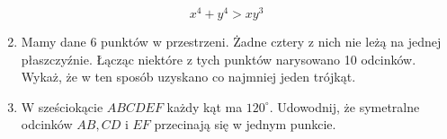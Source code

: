 \documentclass[10pt]{article}
\begin{document}
\[
x^{4}+y^{4}>x y^{3}
\]

\begin{enumerate}
  \setcounter{enumi}{1}
  \item Mamy dane 6 punktów w przestrzeni. Żadne cztery z nich nie leżą na jednej płaszczyźnie. Łącząc niektóre z tych punktów narysowano 10 odcinków. Wykaż, że w ten sposób uzyskano co najmniej jeden trójkąt.
  \item W sześciokącie \(A B C D E F\) każdy kąt ma \(120^{\circ}\). Udowodnij, że symetralne odcinków \(A B, C D\) i \(E F\) przecinają się w jednym punkcie.
\end{enumerate}
\end{document}
